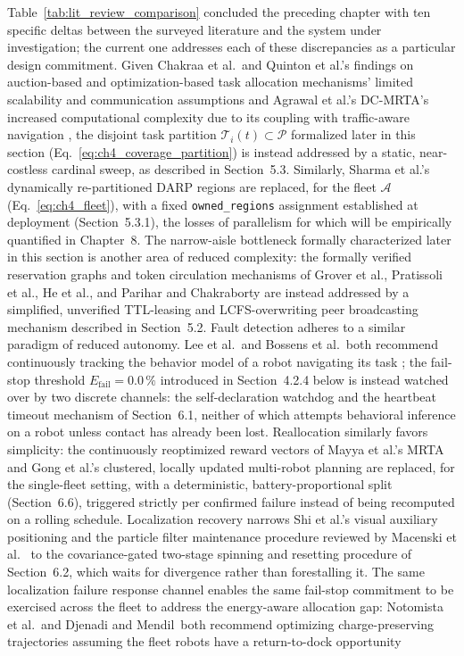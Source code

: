 Table~\ref{tab:lit_review_comparison} concluded the preceding chapter with ten specific deltas between the surveyed literature and the system under investigation; the current one addresses each of these discrepancies as a particular design commitment. Given Chakraa et al.\ and Quinton et al.'s findings on auction-based and optimization-based task allocation mechanisms' limited scalability and communication assumptions \cite{chakraa2023optimization,quinton2023market} and Agrawal et al.'s DC-MRTA's increased computational complexity due to its coupling with traffic-aware navigation \cite{agrawal2022dcmrta}, the disjoint task partition $\mathcal{T}_i(t) \subset \mathcal{P}$ formalized later in this section (Eq.~\eqref{eq:ch4_coverage_partition}) is instead addressed by a static, near-costless cardinal sweep, as described in Section~5.3. Similarly, Sharma et al.'s dynamically re-partitioned DARP regions \cite{sharma2026darp} are replaced, for the fleet $\mathcal{A}$ (Eq.~\eqref{eq:ch4_fleet}), with a fixed \texttt{owned\_regions} assignment established at deployment (Section~5.3.1), the losses of parallelism for which will be empirically quantified in Chapter~8. The narrow-aisle bottleneck formally characterized later in this section is another area of reduced complexity: the formally verified reservation graphs and token circulation mechanisms of Grover et al., Pratissoli et al., He et al., and Parihar and Chakraborty \cite{grover2023deadlock,pratissoli2024hierarchical,he2023deadlock,parihar2022token,lee2025optimizing} are instead addressed by a simplified, unverified TTL-leasing and LCFS-overwriting peer broadcasting mechanism described in Section~5.2. Fault detection adheres to a similar paradigm of reduced autonomy. Lee et al.\ and Bossens et al.\ both recommend continuously tracking the behavior model of a robot navigating its task \cite{lee2022datadriven,bossens2022resilient}; the fail-stop threshold $E_{\text{fail}} = 0.0\,\%$ introduced in Section~4.2.4 below is instead watched over by two discrete channels: the self-declaration watchdog and the heartbeat timeout mechanism of Section~6.1, neither of which attempts behavioral inference on a robot unless contact has already been lost. Reallocation similarly favors simplicity: the continuously reoptimized reward vectors of Mayya et al.'s MRTA and Gong et al.'s clustered, locally updated multi-robot planning \cite{mayya2021resilient,gong2024resilient} are replaced, for the single-fleet setting, with a deterministic, battery-proportional split (Section~6.6), triggered strictly per confirmed failure instead of being recomputed on a rolling schedule. Localization recovery narrows Shi et al.'s visual auxiliary positioning \cite{shi2022vision} and the particle filter maintenance procedure reviewed by Macenski et al.\ \cite{macenski2023fromdesks} to the covariance-gated two-stage spinning and resetting procedure of Section~6.2, which waits for divergence rather than forestalling it. The same localization failure response channel enables the same fail-stop commitment to be exercised across the fleet to address the energy-aware allocation gap: Notomista et al.\ and Djenadi and Mendil\ both recommend optimizing charge-preserving trajectories assuming the fleet robots have a return-to-dock opportunity 